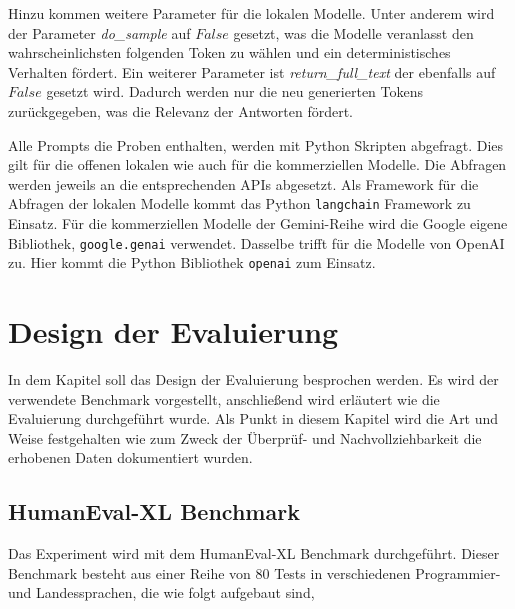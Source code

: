 Hinzu kommen weitere Parameter für die lokalen Modelle. Unter anderem wird der Parameter \textit{do\_sample} auf $False$ gesetzt, was die Modelle veranlasst den wahrscheinlichsten folgenden Token zu wählen und ein deterministisches Verhalten fördert. Ein weiterer Parameter ist \textit{return\_full\_text} der ebenfalls auf $False$ gesetzt wird. Dadurch werden nur die neu generierten Tokens zurückgegeben, was die Relevanz der Antworten fördert.\vspace{0.2cm}

Alle Prompts die Proben enthalten, werden mit Python Skripten abgefragt. Dies gilt für die offenen lokalen wie auch für die kommerziellen Modelle. Die Abfragen werden jeweils an die entsprechenden APIs abgesetzt. Als Framework für die Abfragen der lokalen Modelle kommt das Python \texttt{langchain} Framework zu Einsatz. Für die kommerziellen Modelle der Gemini-Reihe wird die Google eigene Bibliothek, \texttt{google.genai} verwendet. Dasselbe trifft für die Modelle von OpenAI zu. Hier kommt die Python Bibliothek \texttt{openai} zum Einsatz.



\section{Design der Evaluierung}
In dem Kapitel soll das Design der Evaluierung besprochen werden. Es wird der verwendete Benchmark vorgestellt, anschließend wird erläutert wie die Evaluierung durchgeführt wurde. Als Punkt in diesem Kapitel wird die Art und Weise festgehalten wie zum Zweck der Überprüf- und Nachvollziehbarkeit die erhobenen Daten dokumentiert wurden.


\subsection{HumanEval-XL Benchmark}\label{subsec:structor_of_humaneval_xl}
Das Experiment wird mit dem HumanEval-XL Benchmark durchgeführt. Dieser Benchmark besteht aus einer Reihe von 80 Tests in verschiedenen Programmier- und Landessprachen, die wie folgt aufgebaut sind,

